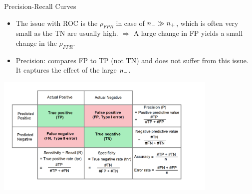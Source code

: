 \begin{vbframe}{Precision-Recall Curves}


\framebreak

\begin{itemize}
  \item The issue with ROC is the $\rho_{FPR}$ in case of $n_{-} \gg n_{+}$, which is often
  very small as the TN are usually high. \newline
  $\Rightarrow$ A large change in FP yields a small change in the $\rho_{FPR}$.
  \item Precision: compares FP to TP (not TN) and does not suffer from this
  issue. It captures the effect of the large $n_{-}$.
\end{itemize}

\begin{center}
  \includegraphics[width=0.8\textwidth]{figure_man/roc-confusion_matrix.png}
\end{center}

\framebreak

\begin{footnotesize}


\end{footnotesize}
\end{vbframe}
